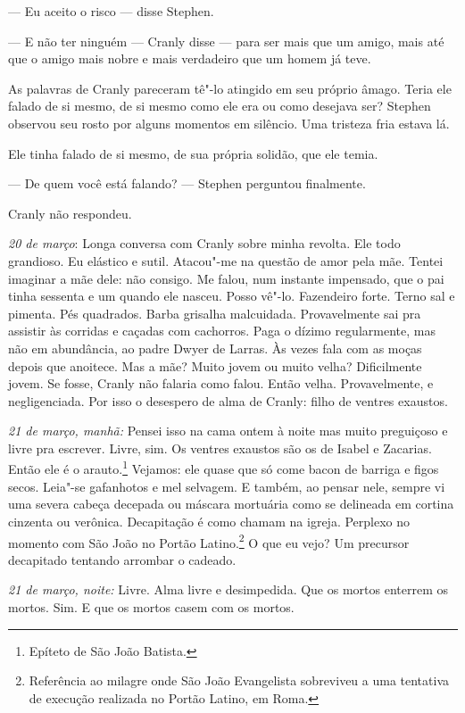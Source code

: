  --- Eu aceito o risco --- disse Stephen.

 --- E não ter ninguém --- Cranly disse --- para ser mais que um amigo, mais até
que o amigo mais nobre e mais verdadeiro que um homem já teve.

As palavras de Cranly pareceram tê"-lo atingido em seu próprio âmago.
Teria ele falado de si mesmo, de si mesmo como ele era ou como desejava
ser? Stephen observou seu rosto por alguns momentos em silêncio. Uma
tristeza fria estava lá.

Ele tinha falado de si mesmo, de sua própria solidão, que ele temia.

 --- De quem você está falando? --- Stephen perguntou finalmente.

Cranly não respondeu.

\asterisc

\medskip\noindent\textit{20 de março}: Longa conversa com Cranly sobre minha revolta. Ele
todo grandioso. Eu elástico e sutil. Atacou"-me na questão de amor pela
mãe. Tentei imaginar a mãe dele: não consigo. Me falou, num instante
impensado, que o pai tinha sessenta e um quando ele nasceu. Posso
vê"-lo. Fazendeiro forte. Terno sal e pimenta.	
Pés quadrados. Barba grisalha malcuidada. Provavelmente sai pra
assistir às corridas e caçadas com cachorros. Paga o dízimo
regularmente, mas não em abundância, ao padre Dwyer de Larras. Às vezes
fala com as moças depois que anoitece. Mas a mãe? Muito jovem ou muito
velha? Dificilmente jovem. Se fosse, Cranly não falaria como falou.
Então velha. Provavelmente, e negligenciada. Por isso o desespero de
alma de Cranly: filho de ventres exaustos.

\medskip\noindent\textit{21 de março, manhã:} Pensei isso na cama ontem à noite mas muito
preguiçoso e livre pra escrever. Livre, sim. Os ventres exaustos são os
de Isabel e Zacarias. Então ele é o arauto.\footnote{ Epíteto de São João Batista.} Vejamos: ele quase que  
só come bacon de barriga e figos secos. Leia"-se gafanhotos e mel
selvagem. E também, ao pensar nele, sempre vi uma severa cabeça
decepada ou máscara mortuária como se delineada em cortina cinzenta ou
verônica. Decapitação é como chamam na igreja. Perplexo no momento com
São João no Portão Latino.\footnote{ Referência ao milagre onde São João
Evangelista sobreviveu a uma tentativa de execução realizada no Portão
Latino, em Roma.} O que eu vejo? Um precursor decapitado tentando
arrombar o cadeado.

\medskip\noindent\textit{21 de março, noite:} Livre. Alma livre e desimpedida. Que os mortos
enterrem os mortos. Sim. E que os mortos casem com os mortos.

